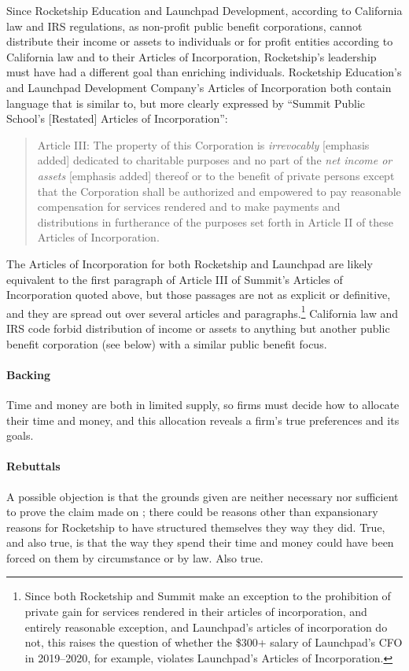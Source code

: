 Since Rocketship Education and Launchpad Development, according to California law and IRS regulations, as non-profit public benefit corporations, cannot distribute their income or assets to individuals or for profit entities according to California law and to their Articles of Incorporation, Rocketship's leadership  must have had a different goal than enriching individuals. Rocketship Education's and Launchpad Development Company's Articles of Incorporation both contain language that is similar to, but more clearly expressed by ``Summit Public School's [Restated] Articles of Incorporation'':
\begin{quotation}
  Article III: The property of this Corporation is \textit{irrevocably} [emphasis added] dedicated to charitable purposes and no part of the \textit{net income or assets} [emphasis added] thereof or to the benefit of private persons except that the Corporation shall be authorized and empowered to pay reasonable compensation for services rendered and to make payments and distributions in furtherance of the purposes set forth in Article II of these Articles of Incorporation. \parencite[2]{SummitPublicSchools2017}
\end{quotation}
The Articles of Incorporation for both Rocketship and Launchpad are likely equivalent to the first paragraph of Article III of Summit's Articles of Incorporation quoted above, but those passages are not as explicit or definitive, and they are spread out over several articles and paragraphs.\footnote{Since both Rocketship and Summit make an exception to the prohibition of private gain for services rendered in their articles of incorporation, and entirely reasonable exception, and Launchpad's articles of incorporation do not, this raises the question of whether the \$300+ salary of Launchpad's CFO \parencite[7]{2019LDC990} in 2019–2020, for example, violates Launchpad's Articles of Incorporation.} California law and IRS code forbid distribution of income or assets to anything but another public benefit corporation (see  below) with a similar public benefit focus. 

\paragraph{Backing}
Time and money are both in limited supply, so firms must decide how to allocate their time and money, and this allocation reveals a firm's true preferences and its goals.

\paragraph{Rebuttals}
A possible objection is that the grounds given are neither necessary nor sufficient to prove the claim made on \pageref{p:claim}; there could be reasons other than expansionary reasons for Rocketship to have structured themselves they way they did. True, and also true, is that the way they spend their time and money could have been forced on them by circumstance or by law. Also true.

